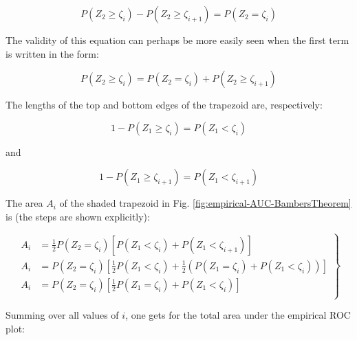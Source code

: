 \documentclass[
]{book}
\begin{document}
\begin{equation}
P\left ( Z_2 \geq \zeta_i \right ) - P\left ( Z_2 \geq \zeta_{i+1} \right ) = P\left ( Z_2 = \zeta_i \right )
\label{eq:empirical-AUC-BambersTheoremProof1}
\end{equation}

The validity of this equation can perhaps be more easily seen when the first term is written in the form:

\begin{equation}
P\left ( Z_2 \geq \zeta_i \right ) = P\left ( Z_2 = \zeta_i \right )  + P\left ( Z_2 \geq \zeta_{i+1} \right )
\label{eq:empirical-AUC-BambersTheoremProof2}
\end{equation}

The lengths of the top and bottom edges of the trapezoid are, respectively:

\begin{equation}
1-P\left ( Z_1 \geq \zeta_i \right )=P\left ( Z_1 < \zeta_i \right )
\label{eq:empirical-AUC-BambersTheoremProof3}
\end{equation}

and

\begin{equation}
1-P\left ( Z_1 \geq \zeta_{i+1} \right )=P\left ( Z_1 < \zeta_{i+1} \right )
\label{eq:empirical-AUC-BambersTheoremProof4}
\end{equation}

The area \(A_i\) of the shaded trapezoid in Fig. \ref{fig:empirical-AUC-BambersTheorem} is (the steps are shown explicitly):

\begin{equation}
\left.
\begin{aligned}
A_i &=\frac{1}{2}P\left ( Z_2 = \zeta_i \right )\left [ P\left ( Z_1 < \zeta_i \right ) +  P\left ( Z_1 < \zeta_{i+1} \right ) \right ] \\
A_i &=P\left ( Z_2 = \zeta_i \right )\left [ \frac{1}{2}P\left ( Z_1 < \zeta_i \right ) +  \frac{1}{2} \left (P\left ( Z_1 = \zeta_i \right ) + P\left ( Z_1 < \zeta_i \right ) \right ) \right ]\\
A_i &=P\left ( Z_2 = \zeta_i \right )\left [ \frac{1}{2} P\left ( Z_1 = \zeta_i \right ) +  P\left ( Z_1 < \zeta_i \right ) \right ] \\
\end{aligned}
\right \}
\label{eq:empirical-AUC-BambersTheoremProof5}
\end{equation}

Summing over all values of \(i\), one gets for the total area under the empirical ROC plot:
\end{document}
